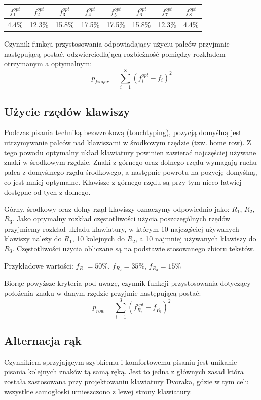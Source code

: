 \documentclass[brudnopis]{xmgr}
\begin{document}
\begin{tabular}{ c | c | c | c | c | c | c | c }
  $f^{opt}_1$ & $f^{opt}_2$ & $f^{opt}_3$ & $f^{opt}_4$ & $f^{opt}_5$ & $f^{opt}_6$ & $f^{opt}_7$ & $f^{opt}_8$ \\
  \hline
  4.4\% & 12.3\% & 15.8\% & 17.5\% & 17.5\% & 15.8\% & 12.3\% & 4.4\% \\
\end{tabular}\newline

Czynnik funkcji przystosowania odpowiadający użyciu palców przyjmnie następującą postać, odzwierciedlającą rozbieżność pomiędzy rozkładem otrzymanym a optymalnym:
$$ p_{finger} = \sum\limits_{i = 1}^{8} (f_i^{opt} - f_i)^2 $$


\subsection{Użycie rzędów klawiszy}

Podczas pisania techniką bezwzrokową (touchtyping), pozycją domyślną jest utrzymywanie palców nad klawiszami w środkowym rzędzie (tzw. home row). Z tego powodu optymalny układ klawiatury powinien zawierać najczęściej używane znaki w środkowym rzędzie. Znaki z górnego oraz dolnego rzędu wymagają ruchu palca z domyślnego rzędu środkowego, a następnie powrotu na pozycję domyślną, co jest mniej optymalne. Klawisze z górnego rzędu są przy tym nieco łatwiej dostępne od tych z dolnego.

Górny, środkowy oraz dolny rząd klawiszy oznaczymy odpowiednio jako: $R_1$, $R_2$, $R_3$. Jako optymalny rozkład częstotliwości użycia poszczególnych rzędów przyjmiemy rozkład układu klawiatury, w którym 10 najczęściej używanych klawiszy należy do $R_1$, 10 kolejnych do $R_2$, a 10 najmniej używanych klawiszy do $R_3$. Częstotliwości użycia obliczane są na podstawie stosowanego zbioru tekstów.

Przykładowe wartości: $f_{R_1} = 50\%$, $f_{R_2} = 35\%$, $f_{R_3} = 15\%$

Biorąc powyższe kryteria pod uwagę, czynnik funkcji przystosowania dotyczący położenia znaku w danym rzędzie przyjmie następującą postać:
$$ p_{row} = \sum\limits_{i = 1}^{3} (f_{R_i}^{opt} - f_{R_i})^2 $$


\subsection{Alternacja rąk}

Czynnikiem sprzyjającym szybkiemu i komfortowemu pisaniu jest unikanie pisania kolejnych znaków tą samą ręką. Jest to jedna z głównych zasad która została zastosowana przy projektowaniu klawiatury Dvoraka, gdzie w tym celu wszystkie samogłoski umieszczono z lewej strony klawiatury.
\end{document}

